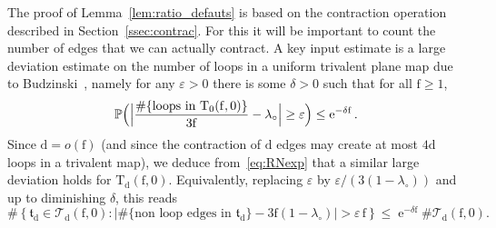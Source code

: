 \documentclass[10pt]{amsart}
\theoremstyle{plain}
\theoremstyle{definition}
\theoremstyle{remark}
\renewcommand{\P}{\mathbb{P}}
\newcommand{\e}{\operatorname{e}}
\newcommand{\Triv}{\mathrm{T}}
\newcommand{\face}{\mathrm{f}}
\newcommand{\defect}{\mathrm{d}}
\begin{document}
The proof of Lemma~\ref{lem:ratio_defauts} is based on the contraction operation described in Section~\ref{ssec:contrac}.
For this it will be important to count the number of edges that we can actually contract. A key input estimate is a large deviation estimate on the number of loops in a uniform trivalent plane map due to Budzinski~\cite[Th.\,2]{Bud21}, namely for any $ \varepsilon>0$ there is some $\delta>0$ such that for all $ \face \geq 1$,
\[
\P\Bigl(\Bigl| \frac{\#\{\text{loops in } \Triv_0(\face, 0)\}}{3 \face} - \lambda_{\circ}\Bigr| \geq \varepsilon \Bigr) \leq \e^{-\delta \face}.
\]
Since $ \defect=o(\face)$ (and since the contraction of $ \defect$ edges may create at most $4 \defect$ loops in a trivalent map), we deduce from~\eqref{eq:RNexp} that a similar large deviation holds for $\mathrm{T}_\defect(\face,0)$.
Equivalently, replacing $\varepsilon$ by $\varepsilon/(3(1-\lambda_{\circ}))$ and up to diminishing $ \delta$, this reads
\begin{equation}\label{eq:grande_dev_loops}
\#\left\{\mathfrak{t}_{\defect} \!\in\! \mathcal{T}_\defect(\face, 0) : \left|\#\{\text{non loop edges in } \mathfrak{t}_\defect\} - 3\face(1-\lambda_{\circ})\right| \!>\! \varepsilon\, \face \right\} \le \e^{-\delta \face}\! \# \mathcal{T}_\defect(\face, 0).
\end{equation}
\end{document}
